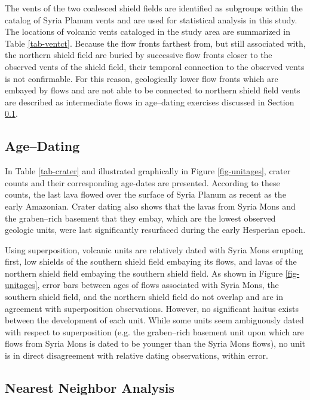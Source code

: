 The vents of the two coalesced shield fields are identified as subgroups within the catalog of Syria Planum vents and are used for statistical analysis in this study. The locations of volcanic vents cataloged in the study area are summarized in Table \ref{tab-ventct}. Because the flow fronts farthest from, but still associated with, the northern shield field are buried by successive flow fronts closer to the observed vents of the shield field, their temporal connection to the observed vents is not confirmable. For this reason, geologically lower flow fronts which are embayed by flows and are not able to be connected to northern shield field vents are described as intermediate flows in age--dating exercises discussed in Section \ref{sec:resultsAgeDating}.

\subsection{Age--Dating}
\label{sec:resultsAgeDating}

In Table \ref{tab-crater} and illustrated graphically in Figure \ref{fig-unitages}, crater counts and their corresponding age-dates are presented. According to these counts, the last lava flowed over the surface of Syria Planum as recent as the early Amazonian. Crater dating also shows that the lavas from Syria Mons and the graben--rich basement that they embay, which are the lowest observed geologic units, were last significantly resurfaced during the early Hesperian epoch.

Using superposition, volcanic units are relatively dated with Syria Mons erupting first, low shields of the southern shield field embaying its flows, and lavas of the northern shield field embaying the southern shield field. As shown in Figure \ref{fig-unitages}, error bars between ages of flows associated with Syria Mons, the southern shield field, and the northern shield field do not overlap and are in agreement with superposition observations. However, no significant haitus exists between the development of each unit. While some units seem ambiguously dated with respect to superposition (e.g. the graben--rich basement unit upon which are flows from Syria Mons is dated to be younger than the Syria Mons flows), no unit is in direct disagreement with relative dating observations, within error.

\subsection{Nearest Neighbor Analysis}

